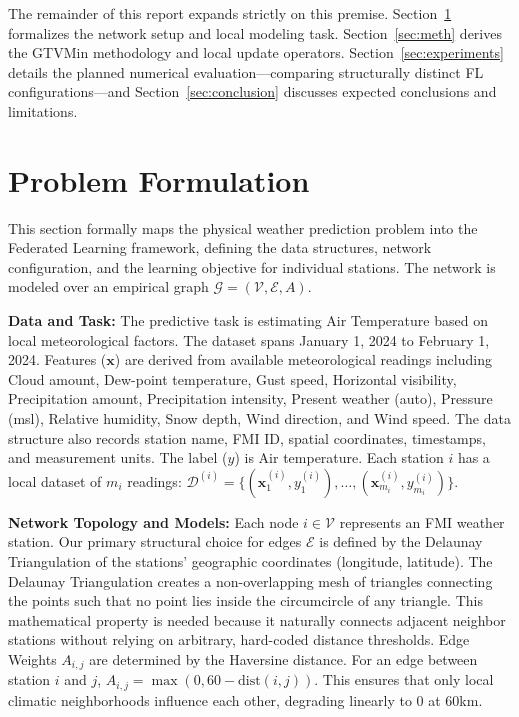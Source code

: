 \documentclass{article}
\begin{document}
The remainder of this report expands strictly on this premise. Section~\ref{sec:pf} formalizes the network setup and local modeling task. Section~\ref{sec:meth} derives the GTVMin methodology and local update operators. Section~\ref{sec:experiments} details the planned numerical evaluation—comparing structurally distinct FL configurations—and Section~\ref{sec:conclusion} discusses expected conclusions and limitations.

\section{Problem Formulation}
\label{sec:pf}

This section formally maps the physical weather prediction problem into the Federated Learning framework, defining the data structures, network configuration, and the learning objective for individual stations. The network is modeled over an empirical graph $\mathcal{G} = (\mathcal{V}, \mathcal{E}, A)$.

\textbf{Data and Task:} The predictive task is estimating Air Temperature based on local meteorological factors. The dataset spans January 1, 2024 to February 1, 2024. Features ($\mathbf{x}$) are derived from available meteorological readings including Cloud amount, Dew-point temperature, Gust speed, Horizontal visibility, Precipitation amount, Precipitation intensity, Present weather (auto), Pressure (msl), Relative humidity, Snow depth, Wind direction, and Wind speed. The data structure also records station name, FMI ID, spatial coordinates, timestamps, and measurement units. The label ($y$) is Air temperature. Each station $i$ has a local dataset of $m_i$ readings: $\mathcal{D}^{(i)} = \{(\mathbf{x}^{(i)}_1, y^{(i)}_1), \dots, (\mathbf{x}^{(i)}_{m_i}, y^{(i)}_{m_i})\}$.

\textbf{Network Topology and Models:} Each node $i \in \mathcal{V}$ represents an FMI weather station. Our primary structural choice for edges $\mathcal{E}$ is defined by the Delaunay Triangulation of the stations' geographic coordinates (longitude, latitude). The Delaunay Triangulation creates a non-overlapping mesh of triangles connecting the points such that no point lies inside the circumcircle of any triangle. This mathematical property is needed because it naturally connects adjacent neighbor stations without relying on arbitrary, hard-coded distance thresholds. Edge Weights $A_{i,j}$ are determined by the Haversine distance. For an edge between station $i$ and $j$, $A_{i,j} = \max(0, 60 - \text{dist}(i,j))$. This ensures that only local climatic neighborhoods influence each other, degrading linearly to 0 at 60km. 
\end{document}
